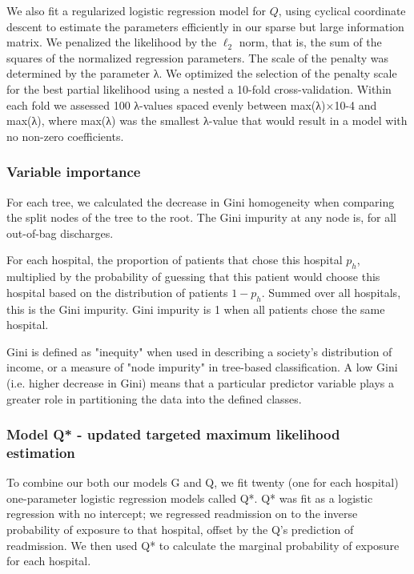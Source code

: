 \documentclass[]{article}\usepackage[]{graphicx}\usepackage[]{color}
\begin{document}
We also fit a regularized logistic regression model for \(Q\), using cyclical coordinate descent to estimate the parameters efficiently in our sparse but large information matrix. We penalized the likelihood by the \(\ell_2\) norm, that is, the sum of the squares of the normalized regression parameters. The scale of the penalty was determined by the parameter λ. We optimized the selection of the penalty scale for the best partial likelihood using a nested a 10-fold cross-validation. Within each fold we assessed 100 λ-values spaced evenly between max(λ)×10-4 and max(λ), where max(λ) was the smallest λ-value that would result in a model with no non-zero coefficients.

\subsubsection{Variable importance}
For each tree, we calculated the decrease in Gini homogeneity when comparing the split nodes of the tree to the root. 
The Gini impurity at any node is, for all out-of-bag discharges.

For each hospital, the proportion of patients that chose this hospital $p_h$, multiplied by the probability of guessing that this patient would choose this hospital based on the distribution of patients $1-p_h$. Summed over all hospitals, this is the Gini impurity. Gini impurity is 1 when all patients chose the same hospital.

Gini is defined as "inequity" when used in describing a society's distribution of income, or a measure of "node impurity" in tree-based classification. A low Gini (i.e. higher decrease in Gini) means that a particular predictor variable plays a greater role in partitioning the data into the defined classes. 


\subsubsection{Model Q* - updated targeted maximum likelihood estimation}
To combine our both our models G and Q, we fit twenty (one for each hospital) one-parameter logistic regression models called Q*. Q* was fit as a logistic regression with no intercept; we regressed readmission on to the inverse probability of exposure to that hospital, offset by the Q's prediction of readmission. We then used Q* to calculate the marginal probability of exposure for each hospital.
\end{document}
